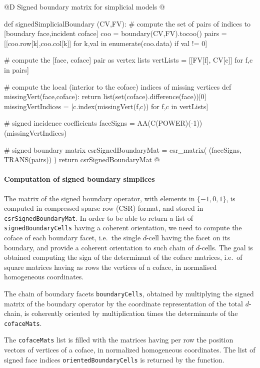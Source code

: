 \documentclass[11pt,oneside]{article}	%
\begin{document}
@D Signed boundary matrix for simplicial models
@{def signedSimplicialBoundary (CV,FV):
	# compute the set of pairs of indices to [boundary face,incident coface]
	coo = boundary(CV,FV).tocoo()
	pairs = [[coo.row[k],coo.col[k]] for k,val in enumerate(coo.data) if val != 0]

	# compute the [face, coface] pair as vertex lists
	vertLists = [[FV[f], CV[c]] for f,c in pairs]

	# compute the local (interior to the coface) indices of missing vertices 
	def missingVert(face,coface): return list(set(coface).difference(face))[0]
	missingVertIndices = [c.index(missingVert(f,c)) for f,c in vertLists]

	# signed incidence coefficients
	faceSigns = AA(C(POWER)(-1))(missingVertIndices)

	# signed boundary matrix
	csrSignedBoundaryMat = csr_matrix( (faceSigns, TRANS(pairs)) )
	return csrSignedBoundaryMat
@}

\paragraph{Computation of signed boundary simplices}

The matrix of the signed boundary operator, with elements in $\{-1,0,1\}$, is computed in compressed sparse row (CSR) format, and stored in \texttt{csrSignedBoundaryMat}. In order to be able to return a list of \texttt{signedBoundaryCells} having a coherent orientation, we need to compute the coface of each boundary facet, i.e.~the single $d$-cell having the facet on its boundary, and provide a coherent orientation to such chain of $d$-cells. The goal is obtained computing the sign of the determinant of the coface matrices, i.e.~of square matrices having as rows the vertices of a coface, in normalised homogeneous coordinates.

The chain of boundary facets \texttt{boundaryCells}, obtained by multiplying the signed matrix of the boundary operator by the coordinate representation of the total $d$-chain, is coherently oriented by multiplication times the determinants of the \texttt{cofaceMats}.

The \texttt{cofaceMats} list is filled 
with the matrices having per row the position vectors of vertices of a coface, in normalized 
homogeneous coordinates. The list of signed face indices \texttt{orientedBoundaryCells} is returned by the function.
\end{document}
